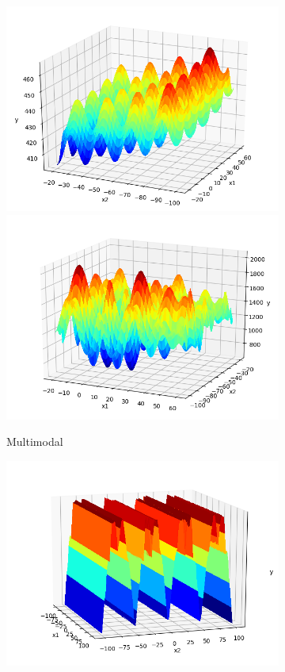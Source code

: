 \documentclass[a4paper,13pt,2p]{report}
\begin{document}
\begin{figure}[!ht]
\begin{subfigure}{0.24\textwidth}
  	 \includegraphics[width=1\linewidth]{png/functions/islo_multi_F15}
  	 \includegraphics[width=1\linewidth]{png/functions/islo_multi_F16}
  	 \caption{Multimodal}
  	\label{subfig:multi}
  	\end{subfigure}
   \begin{subfigure}{0.24\textwidth}
   	\includegraphics[width=1\linewidth]{png/functions/islo_hybrid_F17}

\end{subfigure}
\end{figure}
\end{document}
